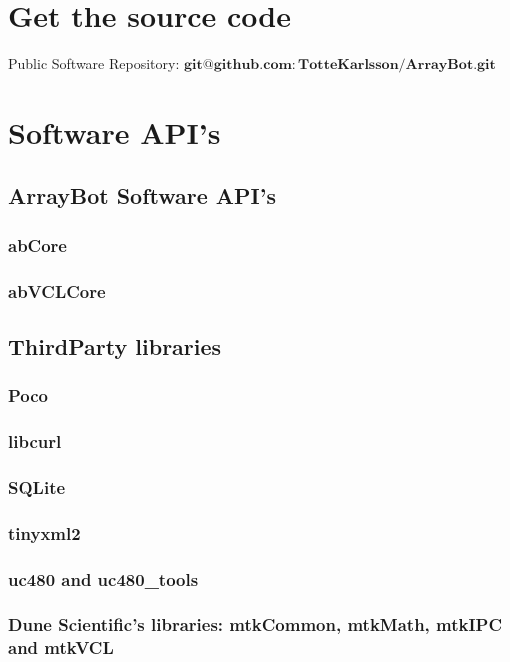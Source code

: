 \documentclass[11pt,fleqn]{book} %
\begin{document}
\begin{appendices}
\chapter{Get the source code}

Public Software Repository: $\mathbf{git@github.com:TotteKarlsson/ArrayBot.git}$

\chapter{Software API's}

\section{ArrayBot Software API's}
\subsection{abCore}
\subsection{abVCLCore}

\section{ThirdParty libraries}
\subsection{Poco}
\subsection{libcurl}
\subsection{SQLite}
\subsection{tinyxml2}
\subsection{uc480 and uc480\_tools}
\subsection{Dune Scientific's libraries: mtkCommon, mtkMath, mtkIPC and mtkVCL}


\end{appendices}
\end{document}
